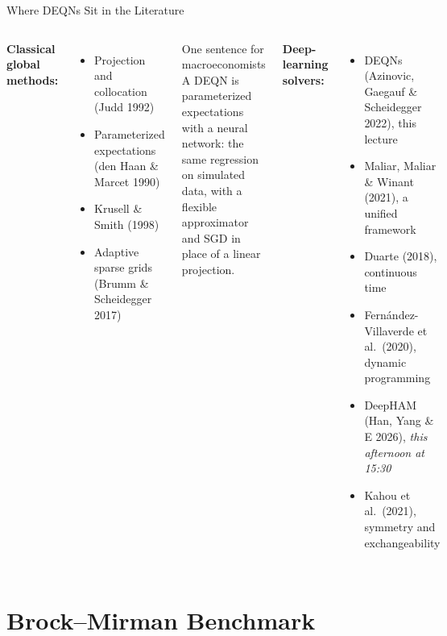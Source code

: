 \documentclass[aspectratio=169,11pt]{beamer}
\newcommand{\emphc}[1]{\textcolor{harvardcrimson}{#1}}
\begin{document}
\begin{frame}{Where DEQNs Sit in the Literature}
\begin{columns}[T]
\textbf{Classical global methods:}
\begin{itemize}\itemsep1pt
    \item Projection and collocation (Judd 1992)
    \item Parameterized expectations (den Haan \& Marcet 1990)
    \item Krusell \& Smith (1998)
    \item Adaptive sparse grids (Brumm \& Scheidegger 2017)
\end{itemize}

\vspace{0.4em}
\begin{exampleblock}{One sentence for macroeconomists}
\footnotesize
A DEQN is \emphc{parameterized expectations with a neural network}: the same regression on simulated data, with a flexible approximator and SGD in place of a linear projection.
\end{exampleblock}

\textbf{Deep-learning solvers:}
\begin{itemize}\itemsep1pt
    \item \emphc{DEQNs} (Azinovic, Gaegauf \& Scheidegger 2022), this lecture
    \item Maliar, Maliar \& Winant (2021), a unified framework
    \item Duarte (2018), continuous time
    \item Fern\'andez-Villaverde et al.\ (2020), dynamic programming
    \item \emphc{DeepHAM} (Han, Yang \& E 2026), \emph{this afternoon at 15:30}
    \item Kahou et al.\ (2021), symmetry and exchangeability
\end{itemize}
\end{columns}
\end{frame}


\section{Brock--Mirman Benchmark}
\end{document}
